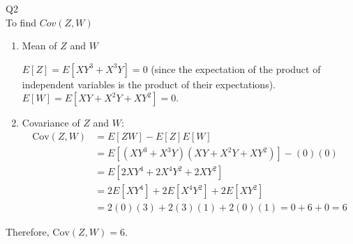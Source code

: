 \documentclass{article}
\begin{document}
Q2 \\
To find $Cov(Z, W)$

\begin{enumerate}
    \item Mean of $Z$ and $W$
   
         $E[Z] = E[XY^3 + X^3Y] = 0$ (since the expectation of the product of independent variables is the product of their expectations).
         $E[W] = E[XY + X^2Y + XY^2] = 0$.
    
    
    
    \item Covariance of $Z$ and $W$:
    \begin{align*}
        \text{Cov}(Z, W) &= E[ZW] - E[Z]E[W] \\
        &= E[(XY^3 + X^3Y)(XY + X^2Y + XY^2)] - (0)(0) \\
        &= E[2XY^4 + 2X^4Y^2 + 2XY^2] \\
        &= 2E[XY^4] + 2E[X^4Y^2] + 2E[XY^2] \\
        &= 2(0)(3) + 2(3)(1) + 2(0)(1) = 0 + 6 + 0 = 6
    \end{align*}
\end{enumerate}

Therefore, $\text{Cov}(Z, W) = 6$.
\end{document}
